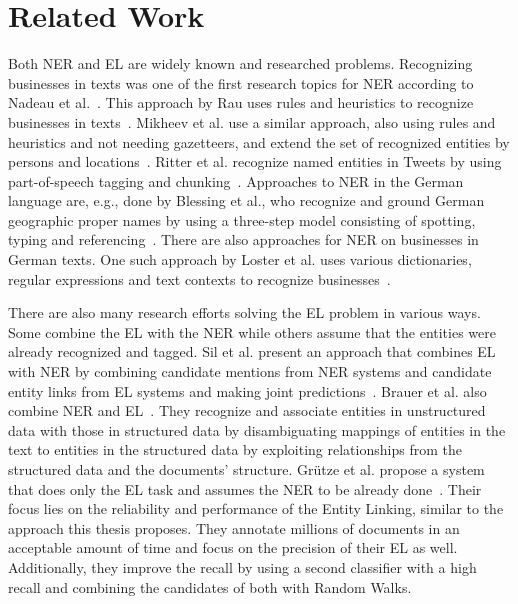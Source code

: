 \section{Related Work}
\label{sec:RelatedWork}
Both NER and EL are widely known and researched problems. Recognizing businesses in texts was one of the first research topics for NER according to Nadeau et al.\ \cite{ner-sekine2007}. This approach by Rau uses rules and heuristics to recognize businesses in texts\ \cite{rau91}. Mikheev et al. use a similar approach, also using rules and heuristics and not needing gazetteers, and extend the set of recognized entities by persons and locations\ \cite{Mikheev:1999:NER:977035.977037}. Ritter et al. recognize named entities in Tweets by using part-of-speech tagging and chunking\ \cite{Ritter:2011:NER:2145432.2145595}. Approaches to NER in the German language are, e.g., done by Blessing et al., who recognize and ground German geographic proper names by using a three-step model consisting of spotting, typing and referencing\ \cite{Blessing:2007:TCM:1316948.1316956}. There are also approaches for NER on businesses in German texts. One such approach by Loster et al. uses various dictionaries, regular expressions and text contexts to recognize businesses\ \cite{Michael2017a}.\par
There are also many research efforts solving the EL problem in various ways. Some combine the EL with the NER while others assume that the entities were already recognized and tagged. Sil et al. present an approach that combines EL with NER by combining candidate mentions from NER systems and candidate entity links from EL systems and making joint predictions\ \cite{Sil:2013:RJN:2505515.2505601}. Brauer et al. also combine NER and EL\ \cite{Brauer:2008:MEE:1458550.1458566}. They recognize and associate entities in unstructured data with those in structured data by disambiguating mappings of entities in the text to entities in the structured data by exploiting relationships from the structured data and the documents' structure. Grütze et al. propose a system that does only the EL task and assumes the NER to be already done\ \cite{coheel}. Their focus lies on the reliability and performance of the Entity Linking, similar to the approach this thesis proposes. They annotate millions of documents in an acceptable amount of time and focus on the precision of their EL as well. Additionally, they improve the recall by using a second classifier with a high recall and combining the candidates of both with Random Walks.
